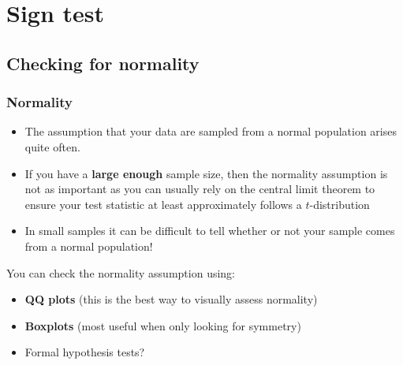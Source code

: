 \documentclass[a4paper]{article}
\begin{document}
\section{Sign test}\label{sec:13}
\subsection{Checking for normality}
\subsubsection{Normality}
\begin{itemize}
	\item The assumption that your data are \textcolor{mygreen}{sampled from a normal population} arises quite often.
	\item If you have a \textbf{large enough} sample size, then the normality assumption is not as important as you can usually rely on the central limit theorem to ensure your \textcolor{myred}{test statistic} at least approximately follows a \( t \)-distribution
	\item In \textcolor{mygreen}{small samples} it can be difficult to tell whether or not your sample comes from a normal population!
\end{itemize}
You can check the normality assumption using:
\begin{itemize}
	\item \textbf{QQ plots} (this is the best way to visually assess normality)
	\item \textbf{Boxplots} (most useful when only looking for symmetry)
	\item Formal hypothesis tests?
\end{itemize}
\end{document}
